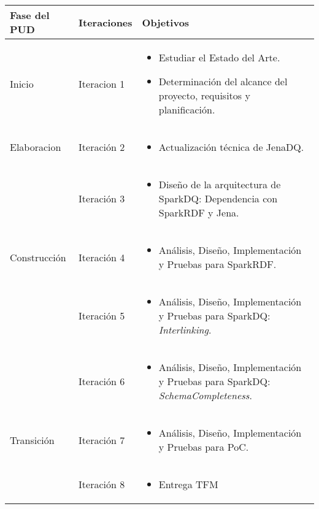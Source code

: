 \vspace{1cm}
\begin{tabular}{|p{}|p{}|p{}|}

\hline

\cellcolor[gray]{0.7}Fase del \acs{PUD} &
\cellcolor[gray]{0.7}Iteraciones &
\cellcolor[gray]{0.7}Objetivos \\
\hline
Inicio & Iteracion 1 &

\begin{itemize}
\item Estudiar el Estado del Arte.
\item Determinación del alcance del proyecto, requisitos y planificación.
\end{itemize}

\\
\hline

Elaboracion & Iteración 2 &

\begin{itemize}

\item Actualización técnica de JenaDQ.
\end{itemize}

\\
& Iteración 3 &


\begin{itemize}
\item Diseño de la arquitectura de SparkDQ: Dependencia con SparkRDF y Jena.
\end{itemize}
\\
\hline


Construcción & Iteración 4 &


\begin{itemize}
\item Análisis, Diseño, Implementación y Pruebas para SparkRDF.
\end{itemize}
\\
& Iteración 5 &

\begin{itemize}
\item Análisis, Diseño, Implementación y Pruebas para SparkDQ: \textit{Interlinking}.
\end{itemize}
\\
& Iteración 6 &

\begin{itemize}
\item Análisis, Diseño, Implementación y Pruebas para SparkDQ: \textit{SchemaCompleteness}.
\end{itemize}
\\
\hline
Transición & Iteración 7 &

\begin{itemize}
\item Análisis, Diseño, Implementación y Pruebas para \acs{PoC}.
\end{itemize}
\\
& Iteración 8 &

\begin{itemize}
\item Entrega \acs{TFM}
\end{itemize}
\\
\hline

\end{tabular}


